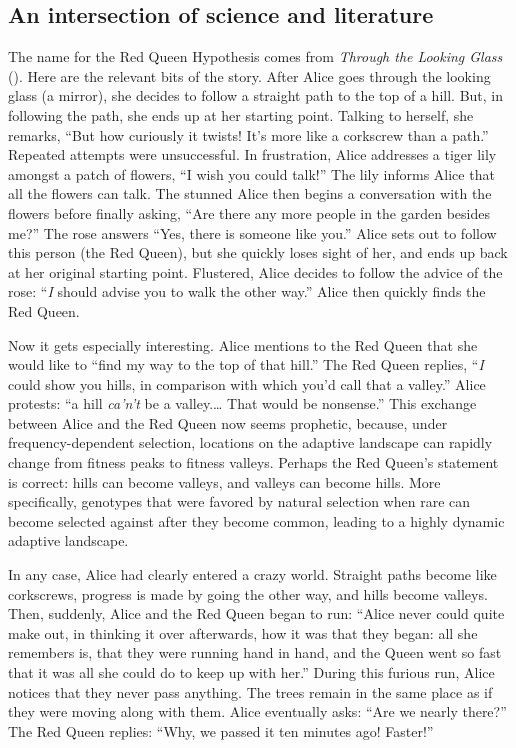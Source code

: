 \documentclass[
  letterpaper,
]{book}
\begin{document}
\subsection{An intersection of science and
literature}\label{an-intersection-of-science-and-literature}

The name for the Red Queen Hypothesis comes from \emph{Through the
Looking Glass} (). Here are the
relevant bits of the story. After Alice goes through the looking glass
(a mirror), she decides to follow a straight path to the top of a hill.
But, in following the path, she ends up at her starting point. Talking
to herself, she remarks, ``But how curiously it twists! It's more like a
corkscrew than a path.'' Repeated attempts were unsuccessful. In
frustration, Alice addresses a tiger lily amongst a patch of flowers,
``I wish you could talk!'' The lily informs Alice that all the flowers
can talk. The stunned Alice then begins a conversation with the flowers
before finally asking, ``Are there any more people in the garden besides
me?'' The rose answers ``Yes, there is someone like you.'' Alice sets
out to follow this person (the Red Queen), but she quickly loses sight
of her, and ends up back at her original starting point. Flustered,
Alice decides to follow the advice of the rose: ``\emph{I} should advise
you to walk the other way.'' Alice then quickly finds the Red Queen.

Now it gets especially interesting. Alice mentions to the Red Queen that
she would like to ``find my way to the top of that hill.'' The Red Queen
replies, ``\emph{I} could show you hills, in comparison with which you'd
call that a valley.'' Alice protests: ``a hill \emph{ca'n't} be a
valley.\ldots{} That would be nonsense.'' This exchange between Alice
and the Red Queen now seems prophetic, because, under
frequency-dependent selection, locations on the adaptive landscape can
rapidly change from fitness peaks to fitness valleys. Perhaps the Red
Queen's statement is correct: hills can become valleys, and valleys can
become hills. More specifically, genotypes that were favored by natural
selection when rare can become selected against after they become
common, leading to a highly dynamic adaptive landscape.

In any case, Alice had clearly entered a crazy world. Straight paths
become like corkscrews, progress is made by going the other way, and
hills become valleys. Then, suddenly, Alice and the Red Queen began to
run: ``Alice never could quite make out, in thinking it over afterwards,
how it was that they began: all she remembers is, that they were running
hand in hand, and the Queen went so fast that it was all she could do to
keep up with her.'' During this furious run, Alice notices that they
never pass anything. The trees remain in the same place as if they were
moving along with them. Alice eventually asks: ``Are we nearly there?''
The Red Queen replies: ``Why, we passed it ten minutes ago! Faster!''
\end{document}
